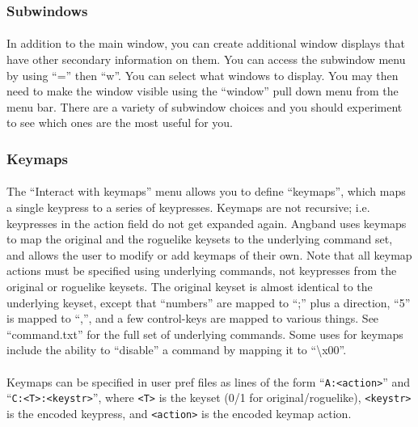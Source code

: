 \subsubsection{Subwindows}
\paragraph{}
In addition to the main window, you can create additional window displays
that have other secondary information on them.  You can access the
subwindow menu by using ``='' then ``w''.  You can select what windows to
display.  You may then need to make the window visible using the
``window'' pull down menu from the menu bar.  There are a variety of
subwindow choices and you should experiment to see which ones are the most
useful for you.

\subsubsection{Keymaps}
\paragraph{}
The ``Interact with keymaps'' menu allows you to define ``keymaps'',
which maps a single keypress to a series of keypresses. Keymaps are not
recursive; i.e. keypresses in the action field do not get expanded again.
Angband uses keymaps to map the original and the roguelike keysets to the
underlying command set, and allows the user to modify or add keymaps of
their own.  Note that all keymap actions must be specified using
underlying commands, not keypresses from the original or roguelike
keysets.  The original keyset is almost identical to the underlying
keyset, except that ``numbers'' are mapped to ``;'' plus a direction,
``5'' is mapped to ``,'', and a few control-keys are mapped to various
things.  See ``command.txt'' for the full set of underlying commands.
Some uses for keymaps include the ability to ``disable'' a command by
mapping it to ``\textbackslash{}x00''.

\paragraph{}
Keymaps can be specified in user pref files as lines of the form
``\verb+A:<action>+'' and ``\verb+C:<T>:<keystr>+'', where \verb+<T>+ is the
keyset (0/1 for original/roguelike), \verb+<keystr>+ is the encoded keypress,
and \verb+<action>+ is the encoded keymap action.

